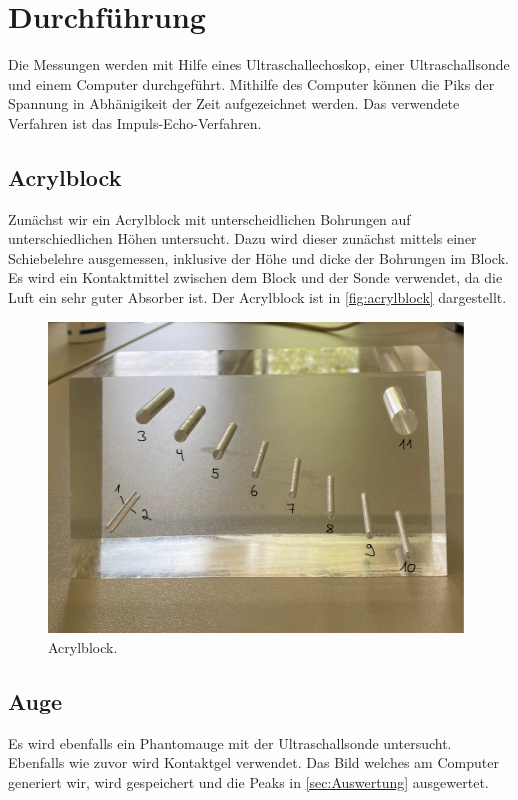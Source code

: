 \section{Durchführung}

Die Messungen werden mit Hilfe eines Ultraschallechoskop, einer Ultraschallsonde und einem Computer durchgeführt. Mithilfe des Computer können die Piks der Spannung in Abhänigikeit der 
Zeit aufgezeichnet werden. Das verwendete Verfahren ist das Impuls-Echo-Verfahren.

\subsection{Acrylblock}
Zunächst wir ein Acrylblock mit unterscheidlichen Bohrungen auf unterschiedlichen Höhen untersucht. Dazu wird dieser zunächst mittels einer Schiebelehre ausgemessen, inklusive der Höhe und
dicke der Bohrungen im Block. \\
Es wird ein Kontaktmittel zwischen dem Block und der Sonde verwendet, da die Luft ein sehr guter Absorber ist. Der Acrylblock ist in \autoref{fig:acrylblock} dargestellt.
\begin{figure}
    \centering
    \includegraphics[width=11cm]{US1quader.pdf}
    \caption{Acrylblock.}
    \label{fig:schall}
  \end{figure}


\subsection{Auge}
Es wird ebenfalls ein Phantomauge mit der Ultraschallsonde untersucht. Ebenfalls wie zuvor wird Kontaktgel verwendet. Das Bild welches am Computer generiert wir, wird gespeichert und 
die Peaks in \autoref{sec:Auswertung} ausgewertet.



